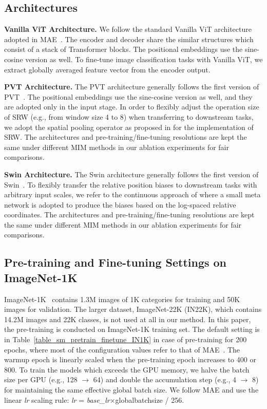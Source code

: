 \documentclass{article}
\begin{document}
\subsection{Architectures}
\textbf{Vanilla ViT Architecture.} We follow the standard Vanilla ViT architecture adopted in MAE~\cite{he2021masked}. The encoder and decoder share the similar structures which consist of a stack of Transformer blocks. The positional embeddings use the sine-cosine version as well. To fine-tune image classification tasks with Vanilla ViT, we extract globally averaged feature vector from the encoder output.

\textbf{PVT Architecture.} The PVT architecture generally follows the first version of PVT~\cite{wang2021pyramid}. The positional embeddings use the sine-cosine version as well, and they are adopted only in the input stage. In order to flexibly adjust the operation size of SRW (e.g., from window size 4 to 8) when transferring to downstream tasks, we adopt the spatial pooling operator as proposed in \cite{wang2022pvtv2} for the implementation of SRW. The architectures and pre-training/fine-tuning resolutions are kept the same under different MIM methods in our ablation experiments for fair comparisons.

\textbf{Swin Architecture.} The Swin architecture generally follows the first version of Swin~\cite{liu2021swin}. To flexibly transfer the relative position biases to downstream tasks with arbitrary input scales, we refer to the continuous approach of \cite{liu2021swinv2} where a small meta network is adopted to produce the biases based on the log-spaced relative coordinates. The architectures and pre-training/fine-tuning resolutions are kept the same under different MIM methods in our ablation experiments for fair comparisons.



\subsection{Pre-training and Fine-tuning Settings on ImageNet-1K}
ImageNet-1K~\cite{deng2009imagenet} contains 1.3M images of 1K categories for training and 50K images for validation. The larger dataset, ImageNet-22K (IN22K), which contains 14.2M
images and 22K classes, is not used at all in our method. 
In this paper, the pre-training is conducted on ImageNet-1K training set. The default setting is in Table~\ref{table_sm_pretrain_finetune_IN1K} in case of pre-training for 200 epochs, where most of the configuration values refer to that of MAE~\cite{he2021masked}. The warmup epoch is linearly scaled when the pre-training epoch increases to 400 or 800. To train the models which exceeds the GPU memory, we halve the batch size per GPU (e.g., 128 $\to$ 64) and double the accumulation step (e.g., 4 $\to$ 8) for maintaining the same effective global batch size. We follow MAE and use the linear \textit{lr} scaling rule: \textit{lr} = \textit{base\_lr}$\times$globalbatchsize / 256.
\end{document}
